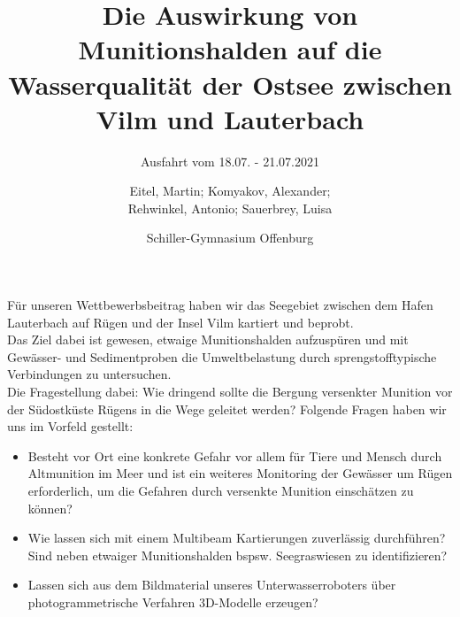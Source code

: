 \documentclass[12pt,titlepage]{scrreprt}
\newcommand{\jens}{Prof. Dr. Jens Greinert }
\begin{document}
% 
\begin{titlepage}

	

\title{Die Auswirkung von Munitionshalden auf die Wasserqualität der Ostsee zwischen Vilm und Lauterbach}
\subtitle{Ausfahrt vom 18.07. - 21.07.2021}
\titlehead{\centering\texttt{[image: Bilder/DSC05220]}}


\author{Eitel, Martin; Komyakov, Alexander; \\ Rehwinkel, Antonio; Sauerbrey, Luisa\\ \and Schiller-Gymnasium Offenburg}

\publishers{Wissenschaftspate: \jens \texttt{jgreinert@geomar.de} \\
\vspace*{2ex} Betreuer: Marek Czernohous \texttt{m.czernohous@schiller-offenburg.de}}

\maketitle

\end{titlepage}
Für unseren Wettbewerbsbeitrag haben wir das Seegebiet zwischen dem Hafen Lauterbach auf Rügen und der Insel Vilm kartiert und beprobt. \\ Das Ziel dabei ist gewesen, etwaige Munitionshalden aufzuspüren 
und mit Gewässer- und Sedimentproben die Umweltbelastung durch sprengstofftypische Verbindungen zu untersuchen.
\\ Die Fragestellung dabei: Wie dringend sollte die Bergung versenkter Munition vor der Südostküste Rügens in die Wege geleitet werden?
Folgende Fragen haben wir uns im Vorfeld gestellt:
\begin{itemize}
\item Besteht vor Ort eine konkrete Gefahr vor allem für Tiere und Mensch durch Altmunition im Meer und ist ein weiteres Monitoring der Gewässer um Rügen erforderlich, um die Gefahren durch versenkte Munition einschätzen zu können? 
\item Wie lassen sich mit einem Multibeam Kartierungen zuverlässig durchführen? Sind neben etwaiger Munitionshalden bspsw. Seegraswiesen zu identifizieren?
\item Lassen sich aus dem Bildmaterial unseres Unterwasserroboters über photogrammetrische Verfahren 3D-Modelle erzeugen?
\end{itemize}
\end{document}
